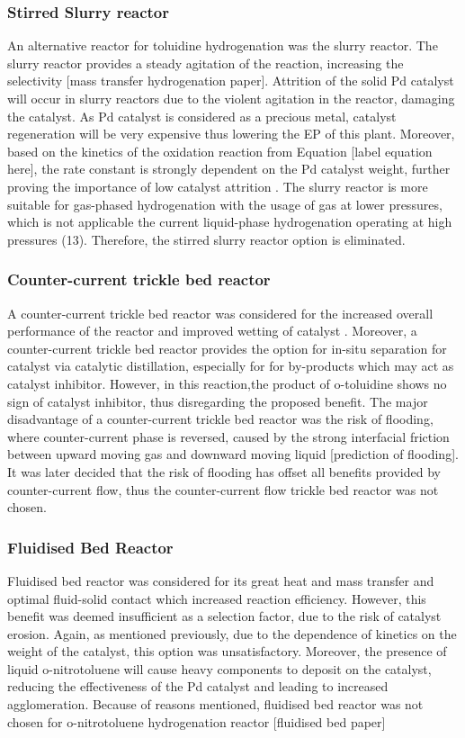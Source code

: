 \subsubsection{Stirred Slurry reactor}
An alternative reactor for toluidine hydrogenation was the slurry reactor. The slurry reactor provides a steady agitation of the reaction, increasing the selectivity [mass transfer hydrogenation paper]. Attrition of the solid Pd catalyst will occur in slurry reactors due to the violent agitation in the reactor, damaging the catalyst. As Pd catalyst is considered as a precious metal, catalyst regeneration will be very expensive thus lowering the EP of this plant. Moreover, based on the kinetics of the oxidation reaction from Equation [label equation here], the rate constant is strongly dependent on the Pd catalyst weight, further proving the importance of low catalyst attrition \cite{rajadhyaksha_solvent_1986}.
The slurry reactor is more suitable for gas-phased hydrogenation with the usage of  gas at lower pressures, which is not applicable the current liquid-phase hydrogenation operating at high pressures (\SI{13}{\atm}). Therefore, the stirred slurry reactor option is eliminated. \cite{ranade_chapter_2011}

\subsubsection{Counter-current trickle bed reactor}
A counter-current trickle bed reactor was considered for the increased overall performance of the reactor and improved wetting of catalyst \cite{kundu_novel_2003}. Moreover, a counter-current trickle bed reactor provides the option for in-situ separation for catalyst via catalytic distillation, especially for for by-products which may act as catalyst inhibitor. However, in this reaction,the product of o-toluidine shows no sign of catalyst inhibitor, thus disregarding the proposed benefit. The major disadvantage of a counter-current trickle bed reactor was the risk of flooding, where counter-current phase is reversed, caused by the strong interfacial friction between upward moving gas and downward moving liquid [prediction of flooding]. It was later decided that the risk of flooding has offset all benefits provided by counter-current flow, thus the counter-current flow trickle bed reactor was not chosen. 

\subsubsection{Fluidised Bed Reactor}
Fluidised bed reactor was considered for its great heat and mass transfer and optimal fluid-solid contact which increased reaction efficiency. However, this benefit was deemed insufficient as a selection factor, due to the risk of catalyst erosion. Again, as mentioned previously, due to the dependence of kinetics on the weight of the catalyst, this option was unsatisfactory. Moreover, the presence of liquid o-nitrotoluene will cause heavy components to deposit on the catalyst, reducing the effectiveness of the Pd catalyst and leading to increased agglomeration. Because of reasons mentioned, fluidised bed reactor was not chosen for o-nitrotoluene hydrogenation reactor [fluidised bed paper]

